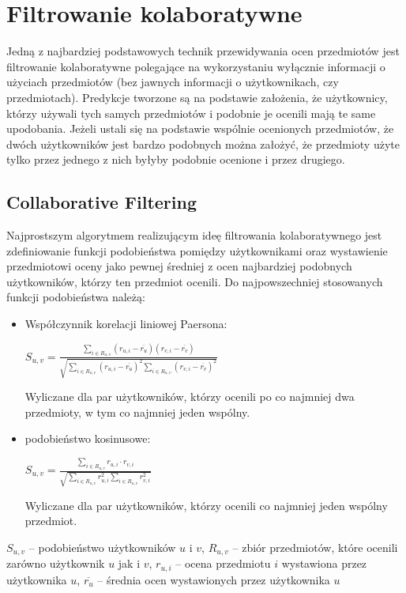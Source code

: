 \documentclass{pracamgr}
\begin{document}
  \section{Filtrowanie kolaboratywne}
   Jedną z najbardziej podstawowych technik przewidywania ocen przedmiotów jest filtrowanie kolaboratywne polegające na wykorzystaniu wyłącznie informacji
   o użyciach przedmiotów (bez jawnych informacji o użytkownikach, czy przedmiotach). Predykcje tworzone są na podstawie założenia, że użytkownicy,
   którzy używali tych samych przedmiotów i podobnie je ocenili mają te same upodobania. Jeżeli ustali się na podstawie wspólnie ocenionych przedmiotów,
   że dwóch użytkowników jest bardzo podobnych można założyć,
   że przedmioty użyte tylko przez jednego z nich byłyby podobnie ocenione i przez drugiego.
   \subsection{Collaborative Filtering}
    Najprostszym algorytmem realizującym ideę filtrowania kolaboratywnego jest zdefiniowanie funkcji podobieństwa pomiędzy użytkownikami
    oraz wystawienie przedmiotowi oceny jako pewnej średniej z ocen najbardziej podobnych użytkowników, którzy ten przedmiot ocenili.\newline
    Do najpowszechniej stosowanych funkcji podobieństwa należą:
    \begin{itemize}\itemsep1pt \parskip0pt 
     \item Współczynnik korelacji liniowej Paersona:
      \begin{center}
       $S_{u,v}=\frac{\sum\limits_{i\in R_{u,v}}(r_{u,i}-\overline{r_u})(r_{v,i}-\overline{r_v})}
       {\sqrt{\sum\limits_{i\in R_{u,v}}(r_{u,i}-\overline{r_u})^2\sum\limits_{i\in R_{u,v}}(r_{v,i}-\overline{r_v})^2}}$
      \end{center}
      Wyliczane dla par użytkowników, którzy ocenili po co najmniej dwa przedmioty, w tym co najmniej jeden wspólny.
     \item podobieństwo kosinusowe:
      \begin{center}
       $S_{u,v}=\frac{\sum\limits_{i\in R_{u,v}}r_{u,i}\cdot r_{v,i}}
       {\sqrt{\sum\limits_{i\in R_{u,v}}r_{u,i}^2\sum\limits_{i\in R_{u,v}}r_{v,i}^2}}$
      \end{center}
      Wyliczane dla par użytkowników, którzy ocenili co najmniej jeden wspólny przedmiot.
    \end{itemize}
    {\scriptsize
     $S_{u,v}$ -- podobieństwo użytkowników $u$ i $v$, $R_{u,v}$ -- zbiór przedmiotów, które ocenili zarówno użytkownik $u$ jak i $v$,\newline
     $r_{u,i}$ -- ocena przedmiotu $i$ wystawiona przez użytkownika $u$, $\overline{r_{u}}$ -- średnia ocen wystawionych przez użytkownika $u$
    }\newline
\end{document}
